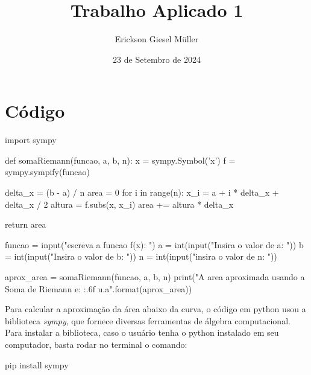\documentclass{article}
\title{Trabalho Aplicado 1}
\author{Erickson Giesel Müller}
\date{23 de Setembro de 2024}
\begin{document}

	\maketitle
	\newpage
	
	
	
	\section{Código}
	\begin{mylist}
import sympy

def somaRiemann(funcao, a, b, n):
    x = sympy.Symbol('x')
    f = sympy.sympify(funcao)

    delta_x = (b - a) / n 
    area = 0
    for i in range(n): 
        x_i = a + i * delta_x + delta_x / 2 
        altura = f.subs(x, x_i)
        area += altura * delta_x 
    
    return area


funcao = input("escreva a funcao f(x): ")
a = int(input("Insira o valor de a: ")) 
b = int(input("Insira o valor de b: ")) 
n = int(input("insira o valor de n: ")) 

aprox_area = somaRiemann(funcao, a, b, n)
print("A area aproximada usando a Soma de Riemann 
e: {:.6f} u.a".format(aprox_area))

	\end{mylist}
	Para calcular a aproximação da área abaixo da curva, o código em python usou a biblioteca \textit{sympy}, que fornece diversas ferramentas de álgebra computacional. Para instalar a biblioteca, caso o usuário tenha o python instalado em seu computador, basta rodar no terminal o comando:
	
	\begin{mylist}
pip install sympy
	\end{mylist}
	\newpage
\end{document}
